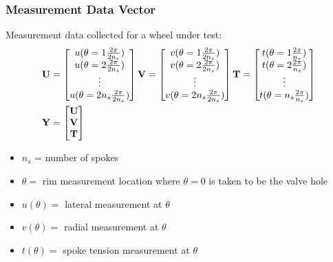 \documentclass[mathserif]{beamer}
\begin{document}
\begin{frame}
\frametitle{Measurement Data Vector}
Measurement data collected for a wheel under test:
\begin{align*}
    \bf U &=  \begin{bmatrix}
        u(\theta = 1\frac{2\pi}{2n_s})\\
        u(\theta = 2\frac{2\pi}{2n_s})\\
        \vdots\\
        u(\theta = 2n_s\frac{2\pi}{2n_s})
        \end{bmatrix}
    \bf V = \begin{bmatrix}
        v(\theta = 1\frac{2\pi}{2n_s})\\
        v(\theta = 2\frac{2\pi}{2n_s})\\
        \vdots\\
        v(\theta = 2n_s\frac{2\pi}{2n_s})
    \end{bmatrix}
        \bf T = \begin{bmatrix}
        t(\theta = 1\frac{2\pi}{n_s})\\
        t(\theta = 2\frac{2\pi}{n_s})\\
        \vdots\\
        t(\theta = n_s\frac{2\pi}{n_s})
    \end{bmatrix} \\
    \bf Y &= \begin{bmatrix}
    \bf U\\\bf V\\ \bf T
    \end{bmatrix}
    \end{align*}
\begin{itemize}
    \item $n_s$ = number of spokes
    \item $\theta=$ rim measurement location where $\theta = 0$ is taken to be the valve hole
    \item $u(\theta)=$ lateral measurement at $\theta$
    \item $v(\theta) = $ radial measurement at $\theta$
    \item $t(\theta)=$ spoke tension measurement at $\theta$
\end{itemize}
\end{frame}
\end{document}

